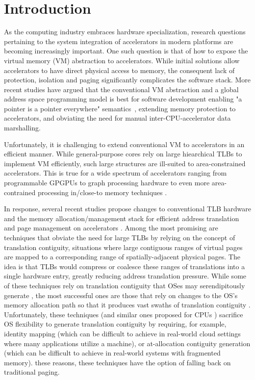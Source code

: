 \section{Introduction}
\label{sec:intro}
As the computing industry embraces hardware specialization, research
questions pertaining to the system integration of accelerators in
modern platforms are becoming increasingly important. One such
question is that of how to expose the virtual memory (VM) abstraction
to accelerators. While initial solutions allow accelerators to have
direct physical access to memory, the consequent lack of protection,
isolation and paging significantly complicates the software
stack. More recent studies have argued that the conventional VM
abstraction and a global address space programming model is best for
software development enabling "a pointer is a pointer everywhere"
semantics~\cite{pichai:architectural, power:supporting,
  haria:devirtualizing, vesely:observation, ausavarungnirun:mosaic},
extending memory protection to accelerators, and obviating the need
for manual inter-CPU-accelerator data marshalling.

Unfortunately, it is challenging to extend conventional VM to
accelerators in an efficient manner. While general-purpose cores rely
on large hiearchical TLBs to implement VM
efficiently, such large structures are ill-suited to area-constrained 
accelerators. This is true for a wide spectrum of
accelerators ranging from programmable GPGPUs
\cite{pichai:architectural, power:supporting} to graph processing
hardware \cite{haria:devirtualizing} to even more area-contrained
processing in/close-to memory techniques \cite{picorel:near-memory}.

In response, several recent studies propose changes to conventional
TLB hardware and the memory allocation/management stack for efficient
address translation and page management on accelerators
\cite{pichai:architectural, power:supporting,
  ausavarungnirun:mosaic}. Among the most promising are techniques
that obviate the need for large TLBs by relying on the concept of
translation contiguity, situations where large contiguous 
ranges of virtual pages are mapped to a corresponding range
of spatially-adjacent physical pages. The idea is that TLBs would
compress or coalesce these ranges of translations into a single
hardware entry, greatly reducing address translation pressure. While
some of these techniques rely on translation contiguity that OSes may
serendipitously generate \cite{pham:colt, bhattacharjee:large-reach, 
cox:efficient, pham:increasing}, the most successful ones are those that
rely on changes to the OS's memory allocation path so that it produces
vast swaths of translation contiguity
\cite{haria:devirtualizing}. Unfortunately, these techniques (and
similar ones proposed for CPUs \cite{basu:efficient, gandhi:range})
sacrifice OS flexibility to generate translation contiguity by
requiring, for example, identity mapping (which can be difficult to
achieve in real-world cloud settings where many applications utilize a
machine), or at-allocation contiguity generation (which can be difficult
to achieve in real-world systems with fragmented memory). %
these reasons, these techniques have the option of falling back on
traditional paging.

